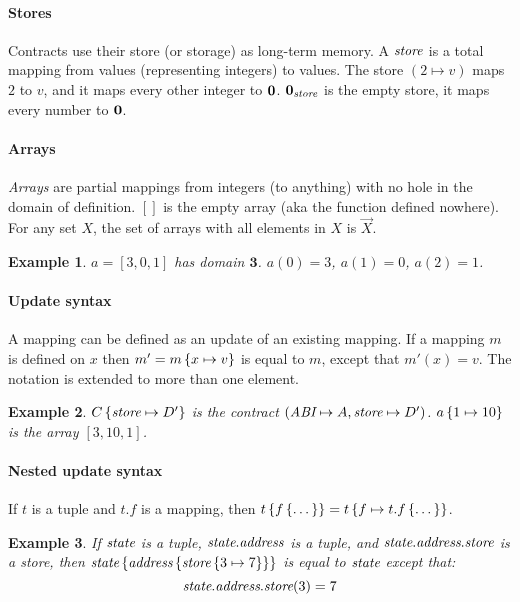 \documentclass[12pt]{extarticle}
\newtheorem{example}{Example}
\begin{document}
\paragraph{Stores} Contracts use their store (or storage) as long-term memory. A $\textit{store}$ is a total mapping from values (representing integers) to values. The store $(2\mapsto v)$ maps $2$ to $v$, and it maps every other integer to $\mathbf{0}$. $\mathbf{0}_\textit{store}$ is the empty store, it maps every number to $\mathbf{0}$.

\paragraph{Arrays}
\emph{Arrays} are partial mappings from integers (to anything) with no hole in the domain of definition. $[]$ is the empty array (aka the function defined nowhere). For any set $X$, the set of arrays with all elements in $X$ is $\vec X$.
\begin{example}
$a = [3,0,1]$ has domain $\mathbf{3}$. $a(0) = 3$, $a(1) = 0$, $a(2) = 1$.
\end{example}

\def\Dom{\textrm{Dom}}
\paragraph{Update syntax}
A mapping can be defined as an update of an existing mapping. If a mapping $m$ is defined on $x$ then $m' = m\left\{x\mapsto v\right\}$ is equal to $m$, except that $m'(x) =v$. The notation is extended to more than one element.

\begin{example} 
$C\left\{\textit{store}\mapsto D'\right\}$ is the contract $(\textit{ABI}\mapsto A,\textit{store}\mapsto D')$. $a\left\{1\mapsto10\right\}$ is the array $[3,10,1]$.
\end{example}

\paragraph{Nested update syntax} If $t$ is a tuple and $t.f$ is a mapping, then $t\left\{f\left\{\dots\right\}\right\} = t\left\{f\mapsto t.f\left\{\dots\right\}\right\}$.

\begin{example} If $\textit{state}$ is a tuple, $\textit{state}.\textit{address}$ is a tuple, and $\textit{state}.\textit{address}.\textit{store}$ is a store, then $\textit{state}\left\{\textit{address}\left\{\textit{store}\left\{3 \mapsto 7\right\}\right\}\right\}$ is equal to $\textit{state}$ except that:
$$\textit{state}.\textit{address}.\textit{store}(3) = 7$$
\end{example}
\end{document}
